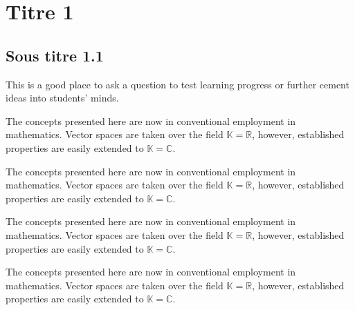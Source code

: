 \documentclass[10pt,fleqn]{article} %
\begin{document}
\vspace{2cm}

\begin{flushright}
\begin{minipage}{.6\linewidth}
\startcontents
{}
\end{minipage}
\end{flushright}

\newpage
\pagestyle{fancy}


\section{Titre 1}
\subsection{Sous titre 1.1}
\lipsum[1-2]

\begin{exercise}[toto]
This is a good place to ask a question to test learning progress or further cement ideas into students' minds.
\end{exercise}

\begin{corollary}
The concepts presented here are now in conventional employment in mathematics. Vector spaces are taken over the field $\mathbb{K}=\mathbb{R}$, however, established properties are easily extended to $\mathbb{K}=\mathbb{C}$.
\end{corollary}

\begin{remark}
The concepts presented here are now in conventional employment in mathematics. Vector spaces are taken over the field $\mathbb{K}=\mathbb{R}$, however, established properties are easily extended to $\mathbb{K}=\mathbb{C}$.
\end{remark}

\begin{theorem}
The concepts presented here are now in conventional employment in mathematics. Vector spaces are taken over the field $\mathbb{K}=\mathbb{R}$, however, established properties are easily extended to $\mathbb{K}=\mathbb{C}$.
\end{theorem}

\begin{theorem}[Titre]
The concepts presented here are now in conventional employment in mathematics. Vector spaces are taken over the field $\mathbb{K}=\mathbb{R}$, however, established properties are easily extended to $\mathbb{K}=\mathbb{C}$.
\end{theorem}
\end{document}
